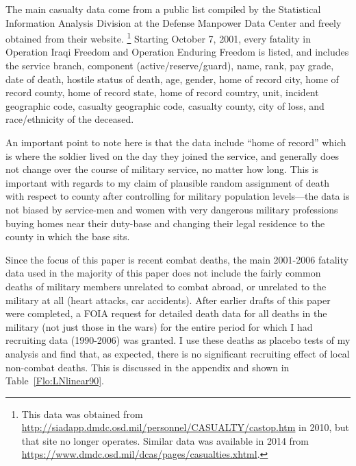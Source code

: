 \documentclass[12pt] {article}
\begin{document}

The main casualty data come from a public list compiled by the Statistical
Information Analysis Division at the Defense Manpower Data Center
and freely obtained from their website. \footnote{This data was obtained from  \url{http://siadapp.dmdc.osd.mil/personnel/CASUALTY/castop.htm} in 2010, but that site no longer operates. Similar data was available in 2014 from \url{https://www.dmdc.osd.mil/dcas/pages/casualties.xhtml}.}
Starting October 7, 2001, every fatality in Operation Iraqi Freedom
and Operation Enduring Freedom is listed, and includes
the service branch, component (active/reserve/guard), name, rank,
pay grade, date of death, hostile status of death, age, gender, home
of record city, home of record county, home of record state, home
of record country, unit, incident geographic code, casualty geographic
code, casualty county, city of loss, and race/ethnicity of the deceased.

An important point to note here is that the data include {}``home
of record'' which is where the soldier lived on the day they joined
the service, and generally does not change over the course of military service, no matter how long. This is important with regards to my claim of plausible
random assignment of death with respect to county after controlling
for military population levels---the data is not biased by service-men
and women with very dangerous military professions buying homes near
their duty-base and changing their legal residence to the county in
which the base sits. 

Since the focus of this paper is recent combat deaths, the main 2001-2006 fatality data used in the majority of this paper does not include the fairly common deaths of military members unrelated to combat abroad, or unrelated to the military at all (heart attacks, car accidents).  After earlier drafts of this paper were completed, a FOIA request for detailed death data for all  deaths in the military (not just those in the wars) for the entire period for which I had recruiting data (1990-2006) was granted. I use these deaths as placebo tests of my analysis and find that, as expected, there is no significant recruiting effect of local non-combat deaths. This is discussed in the appendix and shown in Table~\ref{Flo:LNlinear90}.
\end{document}
